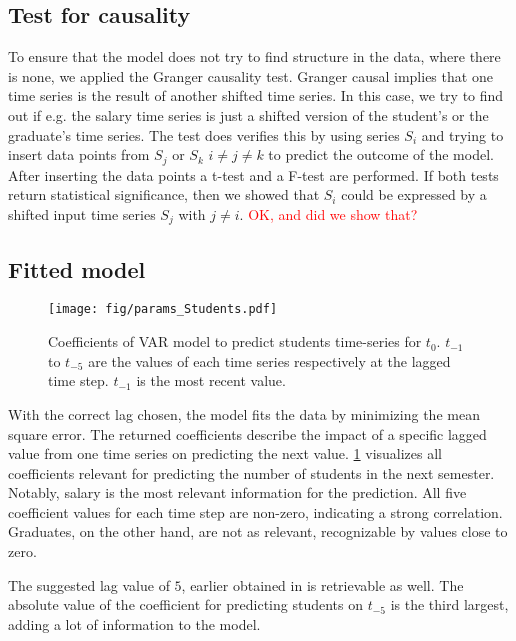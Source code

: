 \documentclass{article}
\theoremstyle{plain}
\theoremstyle{definition}
\theoremstyle{remark}
\begin{document}
\subsection{Test for causality}\label{sec:methods:causality}
To ensure that the model does not try to find structure in the data, where there is none, we applied the Granger causality test.
Granger causal implies that one time series is the result of another shifted time series.
In this case, we try to find out if e.g. the salary time series is just a shifted version of the student's or the graduate's time series.
The test does verifies this by using series $S_i$ and trying to insert data points from $S_j$ or $S_k$ $i \neq j\neq k$
to predict the outcome of the model. After inserting the data points a t-test and a F-test are performed. If both
tests return statistical significance, then we showed that $S_i$ could be expressed by a shifted input time series $S_j$ with $j\neq i$.
\textcolor{red}{OK, and did we show that?}


\subsection{Fitted model}\label{sec:methods:fit}
\begin{figure}
    \texttt{[image: fig/params\_Students.pdf]}
    \caption{Coefficients of VAR model to predict students time-series
    for $t_0$. $t_{-1}$ to $t_{-5}$ are the values of each time series respectively at the lagged time step.
    $t_{-1}$ is the most recent value.}
    \label{fig:student coefficients}
\end{figure}


With the correct lag chosen, the model fits the data by minimizing the mean square error.
The returned coefficients describe the impact of a specific lagged value from one time series
on predicting the next value. \ref{fig:student coefficients} visualizes all coefficients
relevant for predicting the number of students in the next semester. 
Notably, salary is the most relevant information for the prediction. All five
coefficient values for each time step are non-zero, indicating a strong correlation.
Graduates, on the other hand, are not as relevant, recognizable by values close to zero.

The suggested lag value of $5$, earlier obtained in  is retrievable as well.
The absolute value of the coefficient for predicting students on $t_{-5}$ is the third largest, adding
a lot of information to the model.
\end{document}
